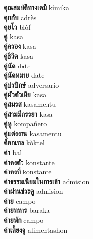 \textbf{ คุณสมบัติทางเคมี  } kímika \\
\textbf{ คุยกับ  } adrès \\
\textbf{ คุยโว  } blòf \\
\textbf{ คู่  } kasa \\
\textbf{ คู่ครอง  } kasa \\
\textbf{ คู่ชีวิต  } kasa \\
\textbf{ คู่นัด  } date \\
\textbf{ คู่นัดหมาย  } date \\
\textbf{ คู่ปรปักษ์  } adversario \\
\textbf{ คู่ผัวตัวเมีย  } kasa \\
\textbf{ คู่สมรส  } kasamentu \\
\textbf{ คู่สามมีภรรยา  } kasa \\
\textbf{ คู่หู  } kompañero \\
\textbf{ คู่แต่งงาน  } kasamentu \\
\textbf{ ค็อกเทล  } kòktel \\
\textbf{ ค่า  } bal \\
\textbf{ ค่าคงตัว  } konstante \\
\textbf{ ค่าคงที่  } konstante \\
\textbf{ ค่าธรรมเนียมในการเข้า  } admision \\
\textbf{ ค่าผ่านประตู  } admision \\
\textbf{ ค่าย  } campo \\
\textbf{ ค่ายทหาร  } baraka \\
\textbf{ ค่ายพัก  } campo \\
\textbf{ ค่าเลี้ยงดู  } alimentashon \\
